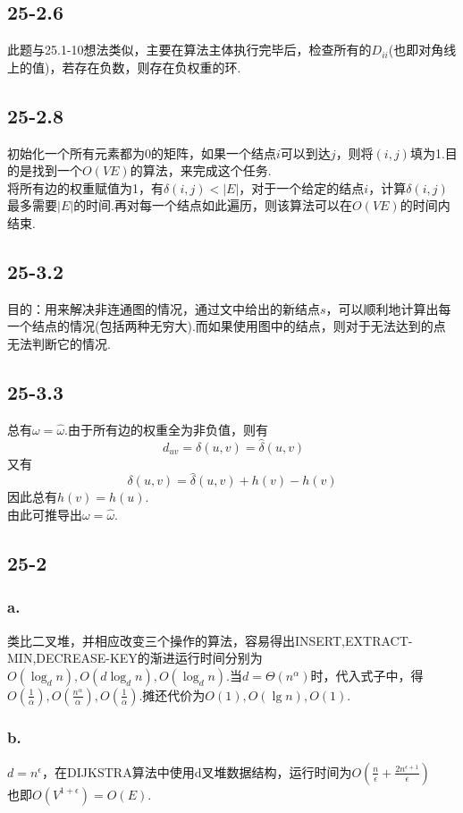 \documentclass[twocolumn]{article}
\newenvironment{SChinese}{%
	\CJKfamily{gbsn}%
	\CJKtilde
	\CJKnospace}{}
\begin{document}
\begin{CJK}{UTF8}{}
\begin{SChinese}
			\subsection*{25-2.6}
				此题与25.1-10想法类似，主要在算法主体执行完毕后，检查所有的$D_{ii}$(也即对角线上的值)，若存在负数，则存在负权重的环.
			\subsection*{25-2.8}
				初始化一个所有元素都为0的矩阵，如果一个结点$i$可以到达$j$，则将$(i,j)$填为1.目的是找到一个$O(VE)$的算法，来完成这个任务.\\
				将所有边的权重赋值为1，有$\delta(i,j) < |E|$，对于一个给定的结点$i$，计算$\delta(i,j)$最多需要$|E|$的时间.再对每一个结点如此遍历，则该算法可以在$O(VE)$的时间内结束.
			\subsection*{25-3.2}
				目的：用来解决非连通图的情况，通过文中给出的新结点$s$，可以顺利地计算出每一个结点的情况(包括两种无穷大).而如果使用图中的结点，则对于无法达到的点无法判断它的情况.
			\subsection*{25-3.3}
				总有$\omega = \widehat{\omega}$.由于所有边的权重全为非负值，则有\[\
				d_{uv} = \delta(u,v) = \widehat{\delta}(u,v)
				\]
				又有\[
				\delta(u,v) = \widehat{\delta}(u,v)+h(v)-h(v) \]
				因此总有$h(v) = h(u)$.\\
				由此可推导出$\omega = \widehat{\omega}$.
			\subsection*{25-2}
			\subsubsection*{a.}
				类比二叉堆，并相应改变三个操作的算法，容易得出INSERT,EXTRACT-MIN,DECREASE-KEY的渐进运行时间分别为$O(\log_dn),O(d\log_dn),O(\log_dn)$.当$d = \varTheta(n^{\alpha})$时，代入式子中，得$O(\frac{1}{\alpha}),O(\frac{n^{\alpha}}{\alpha}),O(\frac{1}{\alpha})$.摊还代价为$O(1),O(\lg n),O(1)$.
			\subsubsection*{b.}
				$d = n^{\epsilon}$，在DIJKSTRA算法中使用d叉堆数据结构，运行时间为$O(\frac{n}{\epsilon}+\frac{2n^{\epsilon+1}}{\epsilon})$\\
				也即$O(V^{1+\epsilon}) = O(E)$.

\end{SChinese}
\end{CJK}
\end{document}
